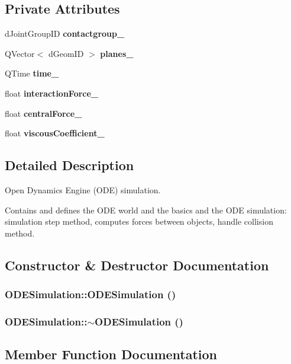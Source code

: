 \subsection*{Private Attributes}
\begin{CompactItemize}
\item 
dJointGroupID {\bf contactgroup\_\-}
\item 
QVector$<$ dGeomID $>$ {\bf planes\_\-}
\item 
QTime {\bf time\_\-}
\item 
float {\bf interactionForce\_\-}
\item 
float {\bf centralForce\_\-}
\item 
float {\bf viscousCoefficient\_\-}
\end{CompactItemize}


\subsection{Detailed Description}
Open Dynamics Engine (ODE) simulation. 

Contains and defines the ODE world and the basics and the ODE simulation: simulation step method, computes forces between objects, handle collision method. 

\subsection{Constructor \& Destructor Documentation}
\subsubsection{\setlength{\rightskip}{0pt plus 5cm}ODESimulation::ODESimulation ()}\label{classODESimulation_e594151b85a5528b8c9cc44e268c7256}


\subsubsection{\setlength{\rightskip}{0pt plus 5cm}ODESimulation::$\sim$ODESimulation ()}\label{classODESimulation_baa90d10deb102d150497ca5db7f1af4}




\subsection{Member Function Documentation}
